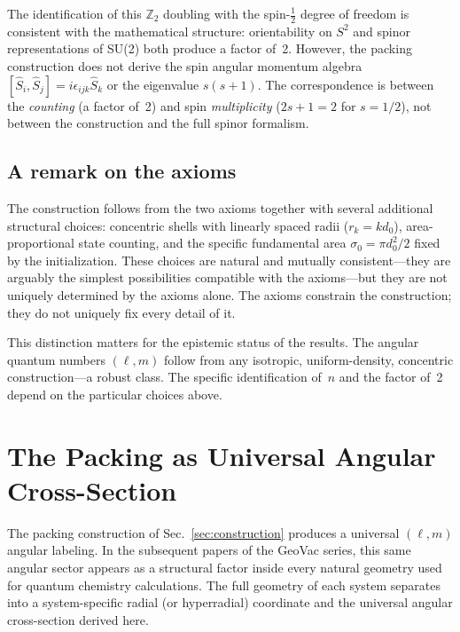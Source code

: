 \documentclass[aps,prl,reprint,amsmath,amssymb]{revtex4-2}
\begin{document}
The identification of this $\mathbb{Z}_2$ doubling with the
spin-$\tfrac{1}{2}$ degree of freedom is consistent with the
mathematical structure: orientability on $S^2$ and spinor
representations of SU(2) both produce a factor of~2.  However, the
packing construction does not derive the spin angular momentum algebra
$[\hat{S}_i, \hat{S}_j] = i\epsilon_{ijk}\hat{S}_k$ or the
eigenvalue $s(s+1)$.  The correspondence is between the \emph{counting}
(a factor of~2) and spin \emph{multiplicity} ($2s+1 = 2$ for
$s = 1/2$), not between the construction and the full spinor
formalism.

\subsection{A remark on the axioms}

The construction follows from the two axioms together with several
additional structural choices: concentric shells with linearly spaced
radii ($r_k = k d_0$), area-proportional state counting, and the
specific fundamental area $\sigma_0 = \pi d_0^2 / 2$ fixed by the
initialization.  These choices are natural and mutually
consistent---they are arguably the simplest possibilities compatible
with the axioms---but they are not uniquely determined by the axioms
alone.  The axioms constrain the construction; they do not uniquely
fix every detail of it.

This distinction matters for the epistemic status of the results.  The
angular quantum numbers $(\ell, m)$ follow from any isotropic,
uniform-density, concentric construction---a robust class.  The
specific identification of~$n$ and the factor of~2 depend on the
particular choices above.


\section{The Packing as Universal Angular Cross-Section}
\label{sec:cross-section}

The packing construction of Sec.~\ref{sec:construction} produces a
universal $(\ell, m)$ angular labeling.  In the subsequent papers of
the GeoVac series, this same angular sector appears as a structural
factor inside every natural geometry used for quantum chemistry
calculations.  The full geometry of each system separates into a
system-specific radial (or hyperradial) coordinate and the universal
angular cross-section derived here.
\end{document}
